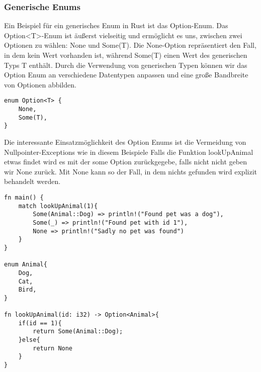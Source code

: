 \documentclass[a4paper, 1ppt]{article}
\begin{document}
\subsubsection{Generische Enums}
Ein Beispiel für ein generisches Enum in Rust ist das Option-Enum.
Das Option<T>-Enum ist äußerst vielseitig und ermöglicht es uns, zwischen zwei Optionen zu wählen: None und Some(T). Die None-Option repräsentiert den Fall, in dem kein Wert vorhanden ist, während Some(T) einen Wert des generischen Typs T enthält. Durch die Verwendung von generischen Typen können wir das Option Enum an verschiedene Datentypen anpassen und eine große Bandbreite von Optionen abbilden.
\begin{verbatim}
enum Option<T> {
	None,
	Some(T),
}
\end{verbatim}

Die interessante Einsatzmöglichkeit des Option Enums ist die Vermeidung von Nullpointer-Exceptions wie in diesem Beispiele
Falls die Funktion lookUpAnimal etwas findet wird es mit der some Option zurückgegebe, falls nicht nicht geben wir None zurück. Mit None kann so der Fall, in dem nichts gefunden wird explizit behandelt werden.
\begin{verbatim}
fn main() {
    match lookUpAnimal(1){
        Some(Animal::Dog) => println!("Found pet was a dog"),
        Some(_) => println!("Found pet with id 1"),
        None => println!("Sadly no pet was found")
    }
}

enum Animal{
    Dog,
    Cat,
    Bird,
}

fn lookUpAnimal(id: i32) -> Option<Animal>{
    if(id == 1){
        return Some(Animal::Dog);
    }else{
        return None
    }
}
\end{verbatim}
\end{document}
